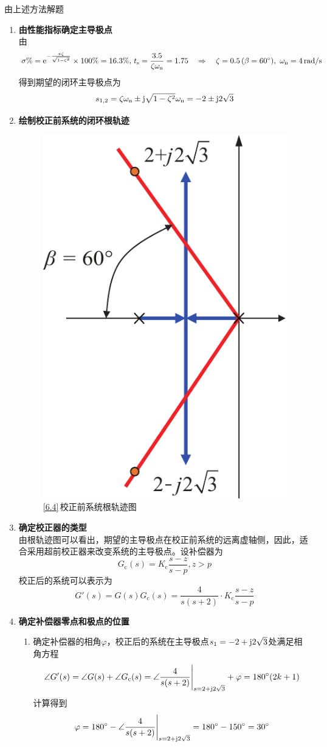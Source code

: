 \solve 由上述方法解题
\begin{enumerate}
	\item \textbf{由性能指标确定主导极点}\\
	由
	\[
	\sigma \% = {\rm{e}}^{-\frac{\pi \zeta}{\sqrt{1 - \zeta^2}}} \times 100\% = 16.3\%, \, t_\text{s} = \dfrac{3.5}{\zeta \omega_{{\rm{n}}}} = 1.75 \quad \Rightarrow \quad \zeta = 0.5\,(\beta = 60 {}^{\circ}),\,\, \omega_{{\rm{n}}} = 4 \,\text{rad/s}
	\]
	得到期望的闭环主导极点为
	\[
	s_{1,2} = \zeta \omega_{{\rm{n}}} \pm \text{j}\sqrt{1 - \zeta^2}\omega_{{\rm{n}}} = -2 \pm  \text{j}2\sqrt{3}
	\]
	
	\item \textbf{绘制校正前系统的闭环根轨迹}
	\begin{figure}[!htb]
		\centering
		\includegraphics[width=0.25\linewidth]{pic/6.4.1.pdf}
		\caption{\ref{6.4}$\,$校正前系统根轨迹图}
	\end{figure}
	
	\item \textbf{确定校正器的类型}\\
	由根轨迹图可以看出，期望的主导极点在校正前系统的远离虚轴侧，因此，适合采用超前校正器来改变系统的主导极点。设补偿器为
	\[
	G_\text{c}(s) = K_\text{c}\dfrac{s - z}{s -p}, z>p
	\]
	校正后的系统可以表示为
	\[
	G'(s) = G(s)G_\text{c}(s) = \dfrac{4}{s(s+2)}\cdot K_\text{c}\dfrac{s-z}{s-p}
	\]
	
	\item \textbf{确定补偿器零点和极点的位置}
	\begin{enumerate}[1.]
		\item 确定补偿器的相角$\varphi$，校正后的系统在主导极点$s_1 = -2 + \text{j} 2 \sqrt{3}$处满足相角方程
		\[
		\angle G'(s) = \angle G(s) + \angle G_\text{c}(s) = \angle \dfrac{4}{s(s+2)}\Bigg|_{s = 2 + \text{j} 2 \sqrt{3}} + \varphi = 180{}^{\circ}(2k + 1)
		\]
		计算得到
		\[
			\varphi = 180{}^{\circ} -  \angle \dfrac{4}{s(s+2)}\Bigg|_{s = 2 + \text{j} 2 \sqrt{3}} = 180 {}^{\circ} - 150{}^{\circ} = 30 {}^{\circ}
		\]
		

\end{enumerate}
\end{enumerate}
